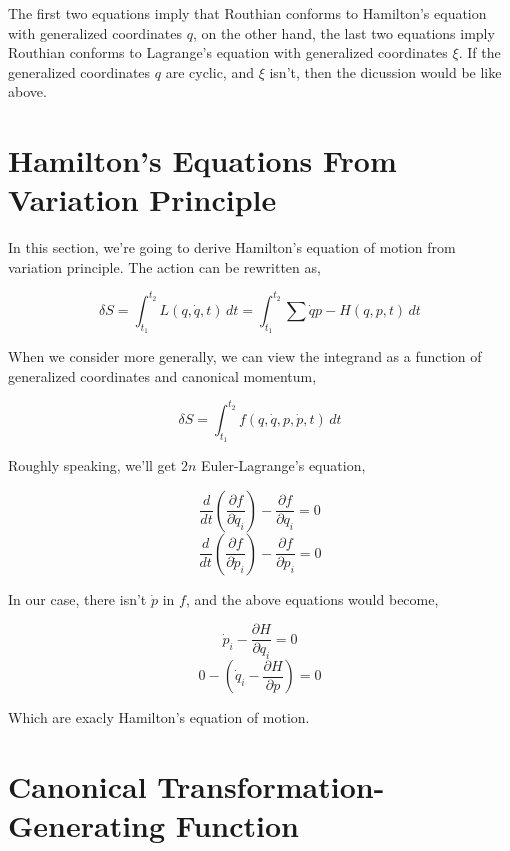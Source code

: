 \documentclass[12pt]{article}
\numberwithin{equation}{section}
\begin{document}
The first two equations imply that Routhian conforms to Hamilton's equation with generalized coordinates $q$, on the other hand, the last two equations imply Routhian conforms to Lagrange's equation with generalized coordinates $\xi$. If the generalized coordinates $q$ are cyclic, and $\xi$ isn't, then the dicussion would be like above.

\section{Hamilton's Equations From Variation Principle}

In this section, we're going to derive Hamilton's equation of motion from variation principle. The action can be rewritten as,

\begin{center}
    \[ \delta S = \int_{t_1}^{t_2}  L(q, \dot{q}, t) \,dt = \int_{t_1}^{t_2} \sum{\dot{q}p} - H(q, p, t) \,dt \]
\end{center}

When we consider more generally, we can view the integrand as a function of generalized coordinates and canonical momentum,

\begin{center}
    \[ \delta S = \int_{t_1}^{t_2} f(q, \dot{q}, p, \dot{p}, t) \,dt \]
\end{center}

Roughly speaking, we'll get $2n$ Euler-Lagrange's equation,

\begin{center}
    \[ \frac{d}{dt} \left(\frac{\partial f}{\partial \dot{q}_i}\right)  - \frac{\partial f}{\partial q_i} = 0 \]
    \[ \frac{d}{dt} \left(\frac{\partial f}{\partial \dot{p}_i}\right)  - \frac{\partial f}{\partial p_i} = 0 \]
\end{center}

In our case, there isn't $\dot{p}$ in $f$, and the above equations would become,

\begin{center}
    \[ \dot{p}_i - \frac{\partial H}{\partial q_i} = 0 \]
    \[ 0 - \left( \dot{q}_i - \frac{\partial H}{\partial p} \right) = 0 \]
\end{center}

Which are exacly Hamilton's equation of motion.

\section{Canonical Transformation-Generating Function}
\end{document}
